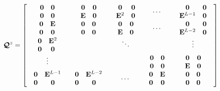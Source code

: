 \begin{equation} \label{Qzcomp}
{\mbox{\boldmath$\cal Q$\unboldmath}}^{z}=\left[
{\begin{array}{ccccc}{\begin{array}{cc}{\bf 0}&{\bf 0}\\
{\bf 0}&{\bf 0}\end{array}}&{\begin{array}{cc}{\bf 0}&{\bf 0}\\
 {\bf E}& {\bf 0}\end{array}}&{\begin{array}{cc}{\bf 0}&{\bf 0}\\
{ {\bf E}}^{2}&{\bf 0}\end{array}}&\cdots &{\begin{array}{cc}{\bf 0}&{\bf 0}\\
{ {\bf E}}^{L-1}&{\bf 0}\end{array}}\\
{\begin{array}{cc}{\bf 0}& {\bf E}\\
 {\bf 0}&{\bf 0}\end{array}}&{\begin{array}{cc}{\bf 0}&{\bf 0}\\
{\bf 0}&{\bf 0}\end{array}}&{\begin{array}{cc}{\bf 0}&{\bf 0}\\
 {\bf E}& {\bf 0}\end{array}}&\cdots &{\begin{array}{cc}{\bf 0}&{\bf 0}\\
{ {\bf E}}^{L-2}&{\bf 0}\end{array}}\\
{\begin{array}{cc}{\bf 0}&{ {\bf E}}^{ 2}\\
{\bf 0}&{\bf 0}\end{array}}&&\ddots&& \vdots\\
 \vdots&&&{\begin{array}{cc}{\bf 0}&{\bf 0}\\
{\bf 0}&{\bf 0}\end{array}}&{\begin{array}{cc}{\bf 0}&{\bf 0}\\
 {\bf E}& {\bf 0}\end{array}}\\
{\begin{array}{cc}{\bf 0}&{ {\bf E}}^{ L-1}\\
{\bf 0}&{\bf 0}\end{array}}&{\begin{array}{cc}{\bf 0}&{ {\bf E}}^{ L-2}\\
{\bf 0}&{\bf 0}\end{array}}& \cdots &{\begin{array}{cc} {\bf 0}&{ {\bf E}}^{}\\
{\bf 0}&{\bf 0}\end{array}}&{\begin{array}{cc} {\bf 0}&{\bf 0}\\
{\bf 0}&{\bf 0}\end{array}}\end{array}}
\right]
\end{equation}
